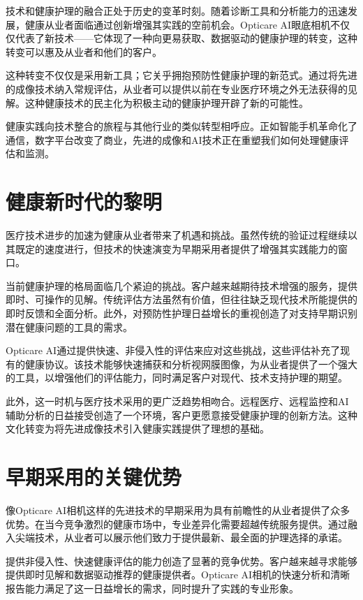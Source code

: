 \documentclass[
  Letterpaper,
]{scrbook}
\begin{document}
技术和健康护理的融合正处于历史的变革时刻。随着诊断工具和分析能力的迅速发展，健康从业者面临通过创新增强其实践的空前机会。Opticare
AI眼底相机不仅仅代表了新技术------它体现了一种向更易获取、数据驱动的健康护理的转变，这种转变可以惠及从业者和他们的客户。

这种转变不仅仅是采用新工具；它关乎拥抱预防性健康护理的新范式。通过将先进的成像技术纳入常规评估，从业者可以提供以前在专业医疗环境之外无法获得的见解。这种健康技术的民主化为积极主动的健康护理开辟了新的可能性。

健康实践向技术整合的旅程与其他行业的类似转型相呼应。正如智能手机革命化了通信，数字平台改变了商业，先进的成像和AI技术正在重塑我们如何处理健康评估和监测。

\section{健康新时代的黎明}\label{ux5065ux5eb7ux65b0ux65f6ux4ee3ux7684ux9eceux660e}

医疗技术进步的加速为健康从业者带来了机遇和挑战。虽然传统的验证过程继续以其既定的速度进行，但技术的快速演变为早期采用者提供了增强其实践能力的窗口。

当前健康护理的格局面临几个紧迫的挑战。客户越来越期待技术增强的服务，提供即时、可操作的见解。传统评估方法虽然有价值，但往往缺乏现代技术所能提供的即时反馈和全面分析。此外，对预防性护理日益增长的重视创造了对支持早期识别潜在健康问题的工具的需求。

Opticare
AI通过提供快速、非侵入性的评估来应对这些挑战，这些评估补充了现有的健康协议。该技术能够快速捕获和分析视网膜图像，为从业者提供了一个强大的工具，以增强他们的评估能力，同时满足客户对现代、技术支持护理的期望。

此外，这一时机与医疗技术采用的更广泛趋势相吻合。远程医疗、远程监控和AI辅助分析的日益接受创造了一个环境，客户更愿意接受健康护理的创新方法。这种文化转变为将先进成像技术引入健康实践提供了理想的基础。

\section{早期采用的关键优势}\label{ux65e9ux671fux91c7ux7528ux7684ux5173ux952eux4f18ux52bf}

像Opticare
AI相机这样的先进技术的早期采用为具有前瞻性的从业者提供了众多优势。在当今竞争激烈的健康市场中，专业差异化需要超越传统服务提供。通过融入尖端技术，从业者可以展示他们致力于提供最新、最全面的护理选择的承诺。

提供非侵入性、快速健康评估的能力创造了显著的竞争优势。客户越来越寻求能够提供即时见解和数据驱动推荐的健康提供者。Opticare
AI相机的快速分析和清晰报告能力满足了这一日益增长的需求，同时提升了实践的专业形象。
\end{document}
